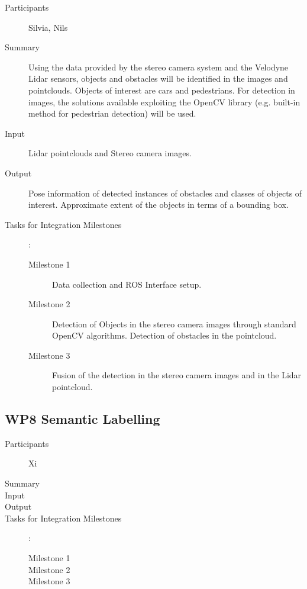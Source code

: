\documentclass[11pt,a4paper]{article}
\begin{document}
\begin{description}
\item[Participants] Silvia, Nils
\item[Summary]
	Using the data provided by the stereo camera system and the Velodyne Lidar sensors, objects and obstacles will be identified in the images and pointclouds. Objects of interest are cars and pedestrians. For detection in images, the solutions available exploiting the OpenCV library (e.g. built-in method for pedestrian detection) will be used. 
\item[Input]
	Lidar pointclouds and Stereo camera images.
\item[Output]
	Pose information of detected instances of obstacles and classes of objects of interest. Approximate extent of the objects in terms of a bounding box.
\item[Tasks for Integration Milestones]:\
	\begin{description}
		\item[Milestone 1]
			Data collection and ROS Interface setup.
		\item[Milestone 2]
			Detection of Objects in the stereo camera images through standard OpenCV algorithms. Detection of obstacles in the pointcloud.
		\item[Milestone 3]
			Fusion of the detection in the stereo camera images and in the Lidar pointcloud.
	\end{description}	 
\end{description}

\subsection{WP8 Semantic Labelling} %

\begin{description}
\item[Participants] Xi
\item[Summary]
\item[Input]
\item[Output]
\item[Tasks for Integration Milestones]:\
	\begin{description}
		\item[Milestone 1]
		\item[Milestone 2]
		\item[Milestone 3] 
	\end{description}	 
\end{description}
\end{document}
